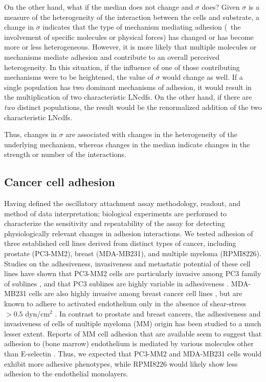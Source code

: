 On the other hand, what if the median does not change and $\sigma$ does? Given $\sigma$ is a measure of the heterogeneity of the interaction between the cells and substrate, a change in $\sigma$ indicates that the type of mechanism mediating adhesion (\ie\ the involvement of specific molecules or physical forces) has changed or has become more or less heterogeneous. However, it is more likely that multiple molecules or mechanisms mediate adhesion and contribute to an overall perceived heterogeneity. In this situation, if the influence of one of those contributing mechanisms were to be heightened, the value of $\sigma$ would change as well. If a single population has two dominant mechanisms of adhesion, it would result in the multiplication of two characteristic LNcdfs. On the other hand, if there are \emph{two} distinct populations, the result would be the renormalized addition of the two characteristic LNcdfs.

Thus, changes in $\sigma$ are associated with changes in the heterogeneity of the underlying mechanism, whereas changes in the median indicate changes in the strength or number of the interactions.

\subsection{Cancer cell adhesion}
Having defined the oscillatory attachment assay methodology, readout, and method of data interpretation; biological experiments are performed to characterize the sensitivity and repeatability of the assay for detecting physiologically relevant changes in adhesion interactions. We tested adhesion of three established cell lines derived from distinct types of cancer, including prostate (PC3-MM2), breast (MDA-MB231), and multiple myeloma (RPMI8226).  Studies on the adhesiveness, invasiveness and metastatic potential of these cell lines have shown that PC3-MM2 cells are particularly invasive among PC3 family of sublines \cite{Daja:2003rr}, and that PC3 sublines are highly variable in adhesiveness \cite{Dimitroff:2004bh}. MDA-MB231 cells are also highly invasive among breast cancer cell lines \cite{TOZEREN:1995wd,Lee:2003kx}, but are known to adhere to activated endothelium only in the absence of shear-stress $> 0.5$ dyn/cm$^2$ \cite{TOZEREN:1995wd}. In contrast to prostate and breast cancers, the adhesiveness and invasiveness of cells of multiple myeloma (MM) origin has been studied to a much lesser extent. Reports of MM cell adhesion that are available seem to suggest that adhesion to (bone marrow) endothelium is mediated by various molecules other than E-selectin \cite{Okada:1995ys,Broek:2008p301,Katz:2010uq}. Thus, we expected that PC3-MM2 and MDA-MB231 cells would exhibit more adhesive phenotypes, while RPMI8226 would likely show less adhesion to the endothelial monolayers.

